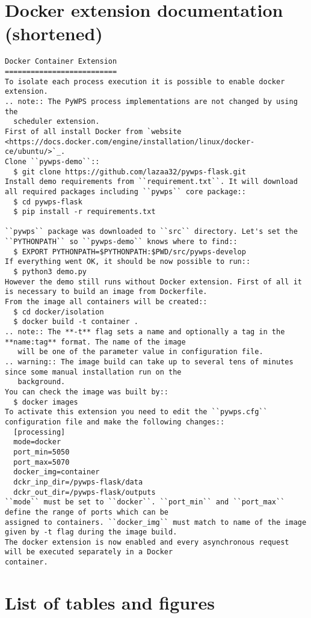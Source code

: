 \newpage
\section{Docker extension documentation (shortened)}
\label{app:docker_ext_docs}
\begin{lstlisting}[basicstyle=\small,caption={Docker extension documentation}]
Docker Container Extension
==========================
To isolate each process execution it is possible to enable docker extension.
.. note:: The PyWPS process implementations are not changed by using the
  scheduler extension.
First of all install Docker from `website <https://docs.docker.com/engine/installation/linux/docker-ce/ubuntu/>`_.
Clone ``pywps-demo``::
  $ git clone https://github.com/lazaa32/pywps-flask.git
Install demo requirements from ``requirement.txt``. It will download all required packages including ``pywps`` core package::
  $ cd pywps-flask
  $ pip install -r requirements.txt

``pywps`` package was downloaded to ``src`` directory. Let's set the ``PYTHONPATH`` so ``pywps-demo`` knows where to find::
  $ EXPORT PYTHONPATH=$PYTHONPATH:$PWD/src/pywps-develop
If everything went OK, it should be now possible to run::
  $ python3 demo.py
However the demo still runs without Docker extension. First of all it is necessary to build an image from Dockerfile.
From the image all containers will be created::
  $ cd docker/isolation
  $ docker build -t container .
.. note:: The **-t** flag sets a name and optionally a tag in the **name:tag** format. The name of the image
   will be one of the parameter value in configuration file.
.. warning:: The image build can take up to several tens of minutes since some manual installation run on the
   background.
You can check the image was built by::
  $ docker images
To activate this extension you need to edit the ``pywps.cfg`` configuration file and make the following changes::
  [processing]
  mode=docker
  port_min=5050
  port_max=5070
  docker_img=container
  dckr_inp_dir=/pywps-flask/data
  dckr_out_dir=/pywps-flask/outputs
``mode`` must be set to ``docker``. ``port_min`` and ``port_max`` define the range of ports which can be
assigned to containers. ``docker_img`` must match to name of the image given by -t flag during the image build.
The docker extension is now enabled and every asynchronous request will be executed separately in a Docker
container.
\end{lstlisting}

\newpage
\section{List of tables and figures}
\listoftables

